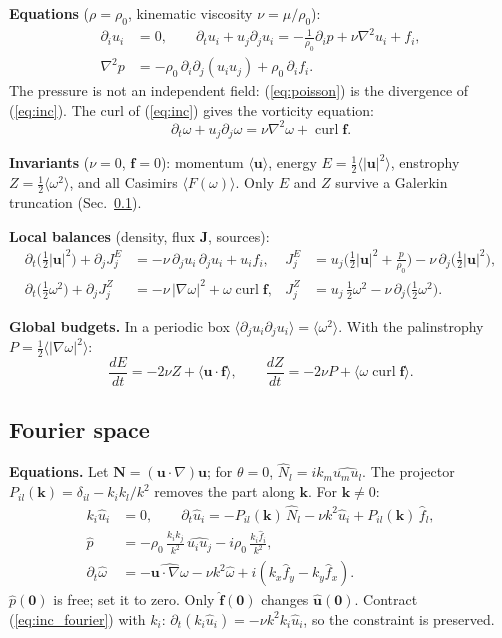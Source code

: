 \documentclass[11pt]{article}
\newcommand{\avg}[1]{\langle #1\rangle}
\newcommand{\curl}{\operatorname{curl}}
\begin{document}
\textbf{Equations} ($\rho=\rho_0$, kinematic viscosity $\nu=\mu/\rho_0$):
\begin{align}
\partial_iu_i&=0,\qquad
\partial_tu_i+u_j\partial_ju_i=-\frac{1}{\rho_0}\partial_ip+\nu\nabla^2u_i+f_i,\label{eq:inc}\\
\nabla^2p&=-\rho_0\,\partial_i\partial_j(u_iu_j)+\rho_0\,\partial_if_i.\label{eq:poisson}
\end{align}
The pressure is not an independent field: (\ref{eq:poisson}) is the divergence of (\ref{eq:inc}).
The curl of (\ref{eq:inc}) gives the vorticity equation:
\begin{equation}
\partial_t\omega+u_j\partial_j\omega=\nu\nabla^2\omega+\curl\bm f .
\end{equation}

\textbf{Invariants} ($\nu=0$, $\bm f=0$): momentum $\avg{\bm u}$, energy $E=\tfrac12\avg{|\bm u|^2}$, enstrophy $Z=\tfrac12\avg{\omega^2}$, and all Casimirs $\avg{F(\omega)}$.
Only $E$ and $Z$ survive a Galerkin truncation (Sec.~\ref{sec:inc_fourier}).

\textbf{Local balances} (density, flux $\bm J$, sources):
\begin{align}
\partial_t\big(\tfrac12|\bm u|^2\big)+\partial_jJ^E_j&=-\nu\,\partial_ju_i\,\partial_ju_i+u_if_i,
&J^E_j&=u_j\Big(\tfrac12|\bm u|^2+\frac{p}{\rho_0}\Big)-\nu\,\partial_j\big(\tfrac12|\bm u|^2\big),\\
\partial_t\big(\tfrac12\omega^2\big)+\partial_jJ^Z_j&=-\nu\,|\nabla\omega|^2+\omega\curl\bm f,
&J^Z_j&=u_j\,\tfrac12\omega^2-\nu\,\partial_j\big(\tfrac12\omega^2\big).
\end{align}

\textbf{Global budgets.} In a periodic box $\avg{\partial_ju_i\partial_ju_i}=\avg{\omega^2}$. With the palinstrophy $P=\tfrac12\avg{|\nabla\omega|^2}$:
\begin{equation}
\frac{dE}{dt}=-2\nu Z+\avg{\bm u\cdot\bm f},\qquad
\frac{dZ}{dt}=-2\nu P+\avg{\omega\curl\bm f}.
\end{equation}

\subsection{Fourier space}\label{sec:inc_fourier}

\textbf{Equations.} Let $\bm N=(\bm u\cdot\nabla)\bm u$; for $\theta=0$, $\hat N_l=ik_m\widehat{u_mu_l}$.
The projector $P_{il}(\bm k)=\delta_{il}-k_ik_l/k^2$ removes the part along $\bm k$. For $\bm k\neq0$:
\begin{align}
k_i\hat u_i&=0,\qquad
\partial_t\hat u_i=-P_{il}(\bm k)\,\hat N_l-\nu k^2\hat u_i+P_{il}(\bm k)\,\hat f_l,\label{eq:inc_fourier}\\
\hat p&=-\rho_0\,\frac{k_ik_j}{k^2}\,\widehat{u_iu_j}-i\rho_0\,\frac{k_i\hat f_i}{k^2},\\
\partial_t\hat\omega&=-\widehat{\bm u\cdot\nabla\omega}-\nu k^2\hat\omega+i(k_x\hat f_y-k_y\hat f_x).
\end{align}
$\hat p(\bm 0)$ is free; set it to zero. Only $\hat{\bm f}(\bm 0)$ changes $\hat{\bm u}(\bm 0)$.
Contract (\ref{eq:inc_fourier}) with $k_i$: $\partial_t(k_i\hat u_i)=-\nu k^2k_i\hat u_i$, so the constraint is preserved.
\end{document}
